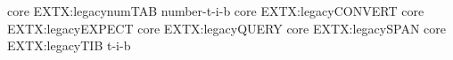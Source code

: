 	{core}	{EXT}{X:legacy}{numTAB}	{number-t-i-b}
	{core}	{EXT}{X:legacy}{CONVERT}{}
		{core}	{EXT}{X:legacy}{EXPECT}	{}
		{core}	{EXT}{X:legacy}{QUERY}	{}
		{core}	{EXT}{X:legacy}{SPAN}	{}
			{core}	{EXT}{X:legacy}{TIB}		{t-i-b}
